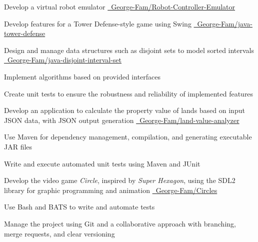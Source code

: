\documentclass[letterpaper,10pt]{article}
\begin{document}
  \begin{resume_list}
    \item Develop a virtual robot emulator {\small \href{https://github.com/George-Fam/Robot-Controller-Emulator}{\faGithubSquare\ George-Fam/Robot-Controller-Emulator}}
    \vspace{2pt}
    \item Develop features for a Tower Defense-style game using Swing {\small \href{https://github.com/George-Fam/java-tower-defense}{\faGithubSquare\ George-Fam/java-tower-defense}}
    \vspace{2pt}
    \item Design and manage data structures such as disjoint sets to model sorted intervals {\small \href{https://github.com/George-Fam/java-disjoint-interval-set}{\faGithubSquare\ George-Fam/java-disjoint-interval-set}}
    \vspace{2pt}
    \item Implement algorithms based on provided interfaces
    \vspace{2pt}
    \item Create unit tests to ensure the robustness and reliability of implemented features
  \end{resume_list}

  \begin{resume_list}
    \item Develop an application to calculate the property value of lands based on input JSON data, with JSON output generation {\small \href{https://github.com/George-Fam/land-value-analyzer}{\faGithubSquare\ George-Fam/land-value-analyzer}}
    \vspace{2pt}
    \item Use Maven for dependency management, compilation, and generating executable JAR files
    \vspace{2pt}
    \item Write and execute automated unit tests using Maven and JUnit
  \end{resume_list}
  
  \begin{resume_list}
    \item Develop the video game \textit{Circle}, inspired by \textit{Super Hexagon}, using the SDL2 library for graphic programming and animation {\small \href{https://github.com/George-Fam/Circles}{\faGithubSquare\ George-Fam/Circles}}
    \vspace{2pt}
    \item Use Bash and BATS to write and automate tests
    \vspace{2pt}
    \item Manage the project using Git and a collaborative approach with branching, merge requests, and clear versioning
  \end{resume_list}
  
\end{document}
